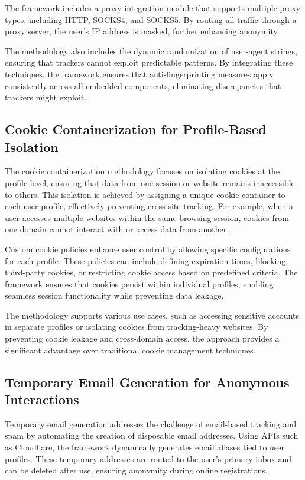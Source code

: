 \documentclass[conference]{IEEEtran}
\begin{document}
The framework includes a proxy integration module that supports multiple proxy types, including HTTP, SOCKS4, and SOCKS5. By routing all traffic through a proxy server, the user’s IP address is masked, further enhancing anonymity.

The methodology also includes the dynamic randomization of user-agent strings, ensuring that trackers cannot exploit predictable patterns. By integrating these techniques, the framework ensures that anti-fingerprinting measures apply consistently across all embedded components, eliminating discrepancies that trackers might exploit.

\subsection{Cookie Containerization for Profile-Based Isolation}
The cookie containerization methodology focuses on isolating cookies at the profile level, ensuring that data from one session or website remains inaccessible to others. This isolation is achieved by assigning a unique cookie container to each user profile, effectively preventing cross-site tracking. For example, when a user accesses multiple websites within the same browsing session, cookies from one domain cannot interact with or access data from another.

Custom cookie policies enhance user control by allowing specific configurations for each profile. These policies can include defining expiration times, blocking third-party cookies, or restricting cookie access based on predefined criteria. The framework ensures that cookies persist within individual profiles, enabling seamless session functionality while preventing data leakage.

The methodology supports various use cases, such as accessing sensitive accounts in separate profiles or isolating cookies from tracking-heavy websites. By preventing cookie leakage and cross-domain access, the approach provides a significant advantage over traditional cookie management techniques.

\subsection{Temporary Email Generation for Anonymous Interactions}
Temporary email generation addresses the challenge of email-based tracking and spam by automating the creation of disposable email addresses. Using APIs such as Cloudflare, the framework dynamically generates email aliases tied to user profiles. These temporary addresses are routed to the user’s primary inbox and can be deleted after use, ensuring anonymity during online registrations.
\end{document}
